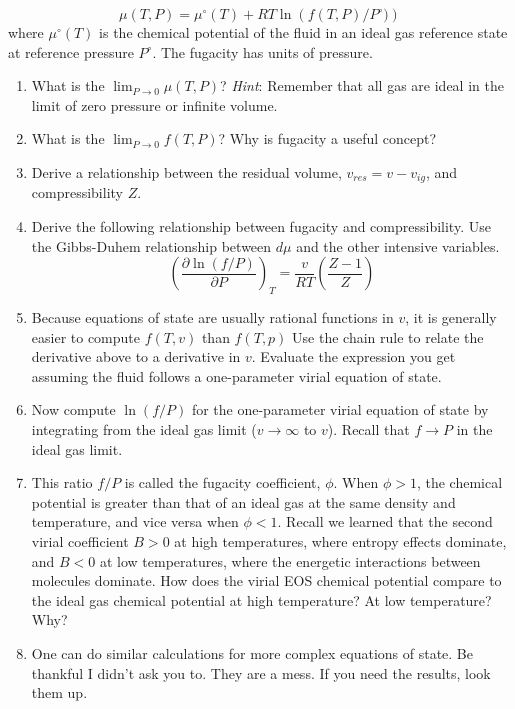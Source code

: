 \documentclass[11pt]{article}
\begin{document}
\[
\mu(T,P) =
\mu^\circ(T) + RT \ln \left ( f(T,P)/ P^\circ) \right )
\]
where \(\mu^{\circ}(T)\) is the chemical potential of the fluid in an ideal gas reference
state at reference pressure \(P^{\circ}\). The fugacity has units of pressure.

\begin{enumerate}
\item What is the \(\lim_{P\rightarrow 0} \mu(T,P)\)?  \emph{Hint}: Remember that all gas are ideal in
the limit of zero pressure or infinite volume.

\item What is the \(\lim_{P\rightarrow 0} f(T,P)\)?  Why is fugacity a useful concept?

\item Derive a relationship between the residual volume, \(v_{res} = v - v_{ig}\), and
compressibility \(Z\).

\item Derive the following relationship between fugacity and compressibility.  Use the Gibbs-Duhem relationship between \(d\mu\) and the other intensive variables.
\begin{equation}
  \left ( \frac{\partial\ln\left(f/P\right)}{\partial P} \right )_{T} = \frac{v}{RT} \left ( \frac{Z-1}{Z} \right )
\end{equation}

\item Because equations of state are usually rational functions in \(v\), it is generally
easier to compute \(f(T,v)\) than \(f(T,p)\) Use the chain rule to relate the derivative
above to a derivative in \(v\). Evaluate the expression you get assuming the fluid
follows a one-parameter virial equation of state.

\item Now compute \(\ln (f/P)\) for the one-parameter virial equation of state by integrating
from the ideal gas limit (\(v \rightarrow \infty\) to \(v\)).  Recall that \(f\rightarrow P\)
in the ideal gas limit.

\item This ratio \(f/P\) is called the fugacity coefficient, \(\phi\). When \(\phi > 1\), the
chemical potential is greater than that of an ideal gas at the same density and
temperature, and vice versa when \(\phi < 1\).  Recall we learned that the second virial
coefficient \(B > 0\) at high temperatures, where entropy effects dominate, and \(B < 0\)
at low temperatures, where the energetic interactions between molecules dominate.  How
does the virial EOS chemical potential compare to the ideal gas chemical potential at high
temperature? At low temperature?  Why?

\item One can do similar calculations for more complex equations of state. Be thankful I
didn't ask you to. They are a mess. If you need the results, look them up.
\end{enumerate}
\end{document}
